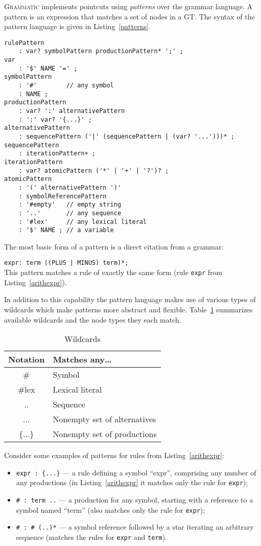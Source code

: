 \documentclass[10pt]{llncs}
\newcommand{\tabref}[1]{Table~\ref{#1}}
\newcommand{\lstref}[1]{Listing~\ref{#1}}
\newcommand{\tool}[1]{\textsc{#1}}
\newcommand{\Grammatic}[0]{\tool{Grammatic}}
\begin{document}
\Grammatic{} implements pointcuts using \emph{patterns} over the grammar language. A pattern is an expression that matches a set of nodes in a GT. The syntax of the pattern language is given in \lstref{patterns}. 
\begin{lstlisting}[language=Grammatic,label=patterns,float,caption=Grammar of the pattern language]
rulePattern 
	: var? symbolPattern productionPattern* ';' ;
var 
	: '$' NAME '=' ;
symbolPattern
	: '#'        // any symbol 
	: NAME ;
productionPattern 
	: var? ':' alternativePattern
	: ':' var? '{...}' ;
alternativePattern 
	: sequencePattern ('|' (sequencePattern | (var? '...')))* ;
sequencePattern
	: iterationPattern+ ;
iterationPattern
	: var? atomicPattern ('*' | '+' | '?')? ;
atomicPattern
	: '(' alternativePattern ')'
	: symbolReferencePattern
	: '#empty'   // empty string
	: '..'       // any sequence
	: '#lex'     // any lexical literal
	: '$' NAME ; // a variable
\end{lstlisting}

The most basic form of a pattern is a direct citation from a grammar:

\lstinline!expr: term ((PLUS | MINUS) term)*;!\\
This pattern matches a rule of exactly the same form (rule \texttt{expr} from \lstref{arithexpr}). 

In addition to this capability the pattern language makes use of various types of wildcards which make patterns more abstract and flexible. \tabref{wildcards} summarizes available wildcards and the node types they each match.

\begin{table}[h!]
\centering
\begin{tabular}{|@{\tt}c|l|}
	\hline
	\bf Notation & \bf Matches any\ldots \\
	\hline
	\# & Symbol \\
	\#lex & Lexical literal \\
	.. & Sequence \\
	... & Nonempty set of alternatives \\
	\{...\} & Nonempty set of productions \\
	\hline
\end{tabular}
\caption{Wildcards}\label{wildcards}
\end{table}

Consider some examples of patterns for rules from \lstref{arithexpr}:
\begin{itemize}
	\item \lstinline!expr : {...}! --- a rule defining a symbol ``expr'', comprising any number of any productions (in \lstref{arithexpr} it matches only the rule for \texttt{expr});
	\item \lstinline!# : term ..! --- a production for any symbol, starting with a reference to a symbol named ``term'' (also matches only the rule for \texttt{expr});
	\item \lstinline!# : # (..)*! --- a symbol reference followed by a star iterating an arbitrary sequence (matches the rules for \texttt{expr} and \texttt{term}).
\end{itemize}
\end{document}
